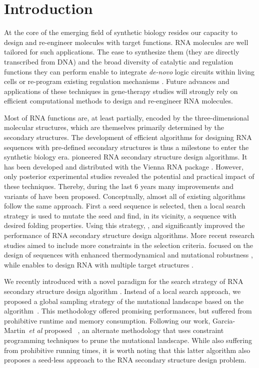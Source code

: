 \section{Introduction}
\label{sec:introduction}

At the core of the emerging field of synthetic biology resides our capacity to design and re-engineer molecules with target functions. RNA molecules are well tailored for such applications. The ease to synthesize them (they are directly transcribed from DNA) and the broad diversity of catalytic and regulation functions they can perform enable to integrate \textit{de-novo} logic  circuits within living cells \citep{Rodrigo:2012fk} or re-program existing regulation mechanisms \citep{Chang:2012uq}. Future advances and applications of these techniques in gene-therapy studies will strongly rely on efficient computational methods to design and re-engineer RNA molecules.

Most of RNA functions are, at least partially, encoded by the three-dimensional molecular structures, which are themselves primarily determined by the secondary structures. The development of efficient algorithms for designing RNA sequences with pre-defined secondary structures is thus a milestone to enter the synthetic biology era. \RNAinverse pioneered RNA secondary structure design algorithms. It has been developed and distributed with the Vienna RNA package \citep{Hofacker:1994}. However, only posterior experimental studies revealed the potential and practical impact of these techniques. Thereby, during the last 6 years many improvements and variants of \RNAinverse have been proposed. Conceptually, almost all of existing algorithms follow the same approach. First a seed sequence is selected, then a local search strategy is used to mutate the seed and find, in its vicinity, a sequence with desired folding properties. Using this strategy, \INFORNA \citep{Busch:2006uq}, \RNASSD \citep{Aguirre-Hernandez:2007kx} and \NUPACK \citep{Zadeh:2011fk} significantly improved the performance of RNA secondary structure design algorithms. More recent research studies aimed to include more constraints in the selection criteria. \RNAexinv focused on the design of sequences with enhanced thermodynamical and mutational robustness \citep{Avihoo:2011fk}, while \frankenstein enables to design RNA with multiple target structures \citep{Lyngso:2012vn}.

We recently introduced with \RNAensign a novel paradigm for the search strategy of RNA secondary structure design algorithm \citep{Levin:2012kx}. Instead of a local search approach, we proposed a global sampling strategy of the mutational landscape based on the \RNAmutants algorithm~\citep{Waldispuhl2008}. This methodology offered promising performances, but suffered from  prohibitive runtime and memory consumption. Following our work, Garcia-Martin~\emph{et al} proposed \RNAiFOLD~\citep{Garcia-Martin:2013aa}, an alternate methodology that uses constraint programming techniques to prune the mutational landscape. While also suffering from prohibitive running times, it is worth noting that this latter algorithm also proposes a seed-less approach to the RNA secondary structure design problem.

